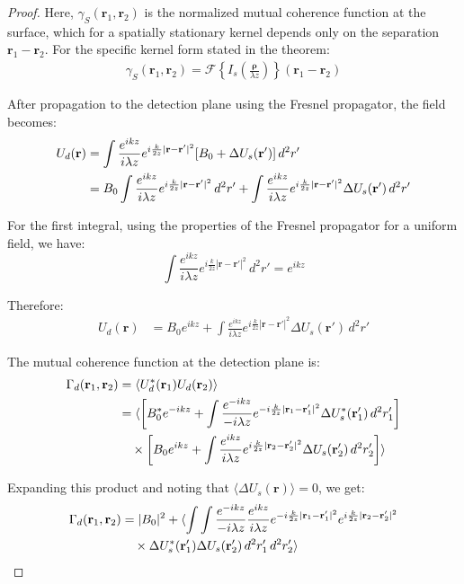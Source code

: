 \documentclass[a4paper,12pt]{article}
\begin{document}
\begin{proof}
Here, $\gamma_S(\mathbf{r}_1, \mathbf{r}_2)$ is the normalized mutual coherence function at the surface, which for a spatially stationary kernel depends only on the separation $\mathbf{r}_1 - \mathbf{r}_2$. For the specific kernel form stated in the theorem:
\begin{align}
\gamma_S(\mathbf{r}_1, \mathbf{r}_2) = \mathcal{F}\left\{I_s\left(\frac{\mathbf{\rho}}{\lambda z}\right)\right\}(\mathbf{r}_1 - \mathbf{r}_2)
\end{align}

After propagation to the detection plane using the Fresnel propagator, the field becomes:
\begin{align}
U_d(\mathbf{r}) &= \int \frac{e^{ikz}}{i\lambda z} e^{i\frac{k}{2z}|\mathbf{r} - \mathbf{r}'|^2} [B_0 + \Delta U_s(\mathbf{r}')] \, d^2r' \\
&= B_0 \int \frac{e^{ikz}}{i\lambda z} e^{i\frac{k}{2z}|\mathbf{r} - \mathbf{r}'|^2} \, d^2r' + \int \frac{e^{ikz}}{i\lambda z} e^{i\frac{k}{2z}|\mathbf{r} - \mathbf{r}'|^2} \Delta U_s(\mathbf{r}') \, d^2r' \notag
\end{align}

For the first integral, using the properties of the Fresnel propagator for a uniform field, we have:
\begin{equation}
\int \frac{e^{ikz}}{i\lambda z} e^{i\frac{k}{2z}|\mathbf{r} - \mathbf{r}'|^2} \, d^2r' = e^{ikz}
\end{equation}

Therefore:
\begin{align}
U_d(\mathbf{r}) &= B_0 e^{ikz} + \int \frac{e^{ikz}}{i\lambda z} e^{i\frac{k}{2z}|\mathbf{r} - \mathbf{r}'|^2} \Delta U_s(\mathbf{r}') \, d^2r'
\end{align}

The mutual coherence function at the detection plane is:
\begin{align}
\Gamma_d(\mathbf{r}_1, \mathbf{r}_2) &= \langle U_d^*(\mathbf{r}_1) U_d(\mathbf{r}_2) \rangle \\
&= \langle \left[B_0^* e^{-ikz} + \int \frac{e^{-ikz}}{-i\lambda z} e^{-i\frac{k}{2z}|\mathbf{r}_1 - \mathbf{r}'_1|^2} \Delta U_s^*(\mathbf{r}'_1) \, d^2r'_1 \right] \notag \\
&\quad \times \left[B_0 e^{ikz} + \int \frac{e^{ikz}}{i\lambda z} e^{i\frac{k}{2z}|\mathbf{r}_2 - \mathbf{r}'_2|^2} \Delta U_s(\mathbf{r}'_2) \, d^2r'_2 \right] \rangle \notag
\end{align}

Expanding this product and noting that $\langle \Delta U_s(\mathbf{r}) \rangle = 0$, we get:
\begin{align}
\Gamma_d(\mathbf{r}_1, \mathbf{r}_2) &= |B_0|^2 + \langle \int\int \frac{e^{-ikz}}{-i\lambda z} \frac{e^{ikz}}{i\lambda z} e^{-i\frac{k}{2z}|\mathbf{r}_1 - \mathbf{r}'_1|^2} e^{i\frac{k}{2z}|\mathbf{r}_2 - \mathbf{r}'_2|^2} \\
&\quad \times \Delta U_s^*(\mathbf{r}'_1) \Delta U_s(\mathbf{r}'_2) \, d^2r'_1 \, d^2r'_2 \rangle \notag
\end{align}


\end{proof}
\end{document}
